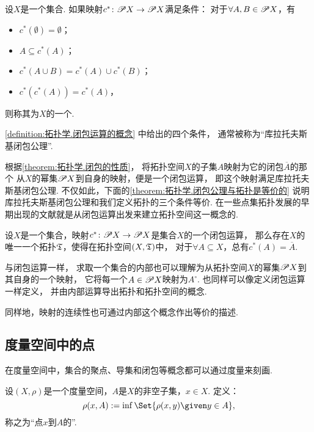 \begin{definition}\label{definition:拓扑学.闭包运算的概念}
设\(X\)是一个集合.
如果映射\(c^*\colon \mathscr{P} X \to \mathscr{P} X\)满足条件：
对于\(\forall A,B \in \mathscr{P} X\)，有\begin{itemize}
	\item \(c^*(\emptyset) = \emptyset\)；
	\item \(A \subseteq c^*(A)\)；
	\item \(c^*(A \cup B) = c^*(A) \cup c^*(B)\)；
	\item \(c^*(c^*(A)) = c^*(A)\)，
\end{itemize}
则称其为\(X\)的一个.
\end{definition}
\cref{definition:拓扑学.闭包运算的概念} 中给出的四个条件，
通常被称为“库拉托夫斯基闭包公理”.

根据\cref{theorem:拓扑学.闭包的性质}，
将拓扑空间\(X\)的子集\(A\)映射为它的闭包\(\overline{A}\)的那个
从\(X\)的幂集\(\mathscr{P} X\)到自身的映射，便是一个闭包运算，
即这个映射满足库拉托夫斯基闭包公理.
不仅如此，下面的\cref{theorem:拓扑学.闭包公理与拓扑是等价的}
说明库拉托夫斯基闭包公理和我们定义拓扑的三个条件等价.
在一些点集拓扑发展的早期出现的文献就是从闭包运算出发来建立拓扑空间这一概念的.

\begin{theorem}\label{theorem:拓扑学.闭包公理与拓扑是等价的}
设\(X\)是一个集合，映射\(c^*\colon \mathscr{P} X \to \mathscr{P} X\)是集合\(X\)的一个闭包运算，
那么存在\(X\)的唯一一个拓扑\(\mathfrak T\)，使得在拓扑空间\((X,\mathfrak T)\)中，
对于\(\forall A \subseteq X\)，总有\(c^*(A) = \overline{A}\).
\end{theorem}

与闭包运算一样，
求取一个集合的内部也可以理解为从拓扑空间\(X\)的幂集\(\mathscr{P} X\)到其自身的一个映射，
它将每一个\(A \in \mathscr{P} X\)映射为\(A^\circ\).
也同样可以像定义闭包运算一样定义，
并由内部运算导出拓扑和拓扑空间的概念.

同样地，映射的连续性也可通过内部这个概念作出等价的描述.

\subsection{度量空间中的点}

在度量空间中，集合的聚点、导集和闭包等概念都可以通过度量来刻画.

\begin{definition}\label{definition:拓扑学.点到点集的距离}
设\((X,\rho)\)是一个度量空间，\(A\)是\(X\)的非空子集，\(x \in X\).
定义：\[
	\rho(x,A) \defeq \inf\Set{ \rho(x,y) \given y \in A },
\]
称之为“点\(x\)到\(A\)的”.
\end{definition}


